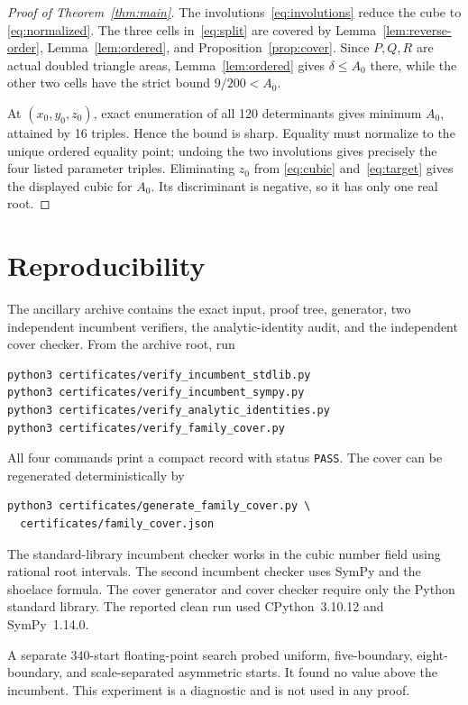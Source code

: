 \documentclass[11pt]{amsart}
\theoremstyle{definition}
\begin{document}
\begin{proof}[Proof of Theorem~\ref{thm:main}]
The involutions~\eqref{eq:involutions} reduce the cube to
\eqref{eq:normalized}.  The three cells in~\eqref{eq:split} are covered by
Lemma~\ref{lem:reverse-order}, Lemma~\ref{lem:ordered}, and
Proposition~\ref{prop:cover}.  Since $P,Q,R$ are actual doubled triangle
areas, Lemma~\ref{lem:ordered} gives $\delta\le A_0$ there, while the other
two cells have the strict bound $9/200<A_0$.

At $(x_0,y_0,z_0)$, exact enumeration of all 120 determinants gives minimum
$A_0$, attained by 16 triples.  Hence the bound is sharp.  Equality must
normalize to the unique ordered equality point; undoing the two involutions
gives precisely the four listed parameter triples.  Eliminating $z_0$ from
\eqref{eq:cubic} and~\eqref{eq:target} gives the displayed cubic for $A_0$.
Its discriminant is negative, so it has only one real root.
\end{proof}

\section{Reproducibility}\label{sec:repro}

The ancillary archive contains the exact input, proof tree, generator, two
independent incumbent verifiers, the analytic-identity audit, and the
independent cover checker.  From the archive root, run
\begin{verbatim}
python3 certificates/verify_incumbent_stdlib.py
python3 certificates/verify_incumbent_sympy.py
python3 certificates/verify_analytic_identities.py
python3 certificates/verify_family_cover.py
\end{verbatim}
All four commands print a compact record with status \texttt{PASS}.  The
cover can be regenerated deterministically by
\begin{verbatim}
python3 certificates/generate_family_cover.py \
  certificates/family_cover.json
\end{verbatim}
The standard-library incumbent checker works in the cubic number field using
rational root intervals.  The second incumbent checker uses SymPy and the
shoelace formula.  The cover generator and cover checker require only the
Python standard library.  The reported clean run used CPython~3.10.12 and
SymPy~1.14.0.

A separate 340-start floating-point search probed uniform, five-boundary,
eight-boundary, and scale-separated asymmetric starts.  It found no value
above the incumbent.  This experiment is a diagnostic and is not used in any
proof.
\end{document}
